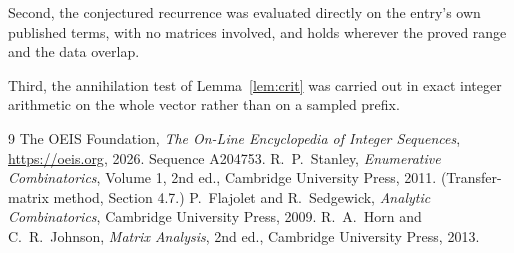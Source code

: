 \documentclass[11pt,a4paper]{article}
\theoremstyle{plain}
\theoremstyle{definition}
\begin{document}
Second, the conjectured recurrence was evaluated directly on the entry's own published terms,
with no matrices involved, and holds wherever the proved range and the data overlap.

Third, the annihilation test of Lemma~\ref{lem:crit} was carried out in exact integer
arithmetic on the whole vector rather than on a sampled prefix.

\begin{thebibliography}{9}
 The OEIS Foundation, \emph{The On-Line Encyclopedia of Integer
Sequences}, \url{https://oeis.org}, 2026. Sequence A204753.
 R.~P.~Stanley, \emph{Enumerative Combinatorics}, Volume 1, 2nd ed.,
Cambridge University Press, 2011. (Transfer-matrix method, Section 4.7.)
 P.~Flajolet and R.~Sedgewick, \emph{Analytic Combinatorics}, Cambridge
University Press, 2009.
 R.~A.~Horn and C.~R.~Johnson, \emph{Matrix Analysis}, 2nd ed., Cambridge
University Press, 2013.
\end{thebibliography}
\end{document}

